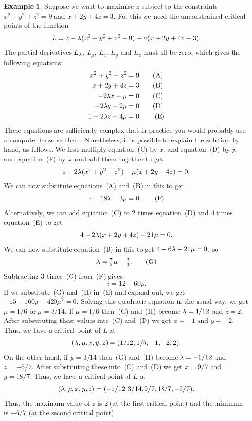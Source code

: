 \documentclass[reqno]{amsart}
\theoremstyle{definition}
\newtheorem{example}[theorem]{Example}
\begin{document}
\begin{example}\label{eg-two-constraints}
 Suppose we want to maximise $z$ subject to the constraints
 $x^2+y^2+z^2=9$ and $x+2y+4z=3$.  For this we need the unconstrained
 critical points of the function 
 \[ L = z - \lambda(x^2+y^2+z^2-9) - \mu(x+2y+4z-3). \]
 The partial derivatives $L_\lambda$, $L_\mu$, $L_x$, $L_y$ and $L_z$ must
 all be zero, which gives the following equations:
 \begin{align*}
  x^2+y^2+z^2      &= 9  \tag{A} \\
  x+2y+4z          &= 3  \tag{B} \\
    -2\lambda x -  \mu &= 0  \tag{C} \\
    -2\lambda y - 2\mu &= 0  \tag{D} \\
  1 -2\lambda z - 4\mu &= 0. \tag{E}
 \end{align*}
 These equations are sufficiently complex that in practice you would
 probably use a computer to solve them.  Nonetheless, it is possible
 to explain the solution by hand, as follows.  We first multiply
 equation~(C) by $x$, and equation~(D) by $y$, and equation~(E) by
 $z$, and add them together to get
 \[ z -2\lambda(x^2+y^2+z^2) - \mu(x+2y+4z) = 0. \]
 We can now substitute equations~(A) and~(B) in this to get
 \[ z - 18\lambda - 3\mu = 0. \tag{F} \]
 Alternatively, we can add equation~(C) to $2$ times equation~(D) and
 $4$ times equation~(E) to get
 \[ 4 - 2\lambda(x+2y+4z) - 21\mu = 0. \]
 We can now substitute equation~(B) in this to get $4-6\lambda-21\mu=0$,
 so 
 \[ \lambda = \tfrac{7}{2}\mu - \tfrac{2}{3}. \tag{G} \]
 Subtracting $3$ times~(G) from~(F) gives 
 \[ z = 12-60\mu. \tag{H} \]
 If we substitute~(G) and~(H) in~(E) and expand out, we get
 $-15+160\mu-420\mu^2=0$.  Solving this quadratic equation in the
 usual way, we get $\mu=1/6$ or $\mu=3/14$.  If $\mu=1/6$ then~(G)
 and~(H) become $\lambda=1/12$ and $z=2$.  After substituting these values
 into~(C) and~(D) we get $x=-1$ and $y=-2$.  Thus, we have a critical
 point of $L$ at 
 \[ (\lambda,\mu,x,y,z) = (1/12,1/6,-1,-2,2). \]
 On the other hand, if $\mu=3/14$ then~(G) and~(H) become $\lambda=-1/12$
 and $z=-6/7$.  After substituting these into~(C) and~(D) we get
 $x=9/7$ and $y=18/7$.  Thus, we have a critical
 point of $L$ at 
 \[ (\lambda,\mu,x,y,z) = (-1/12,3/14,9/7,18/7,-6/7). \]
 Thus, the maximum value of $z$ is $2$ (at the first critical point)
 and the minimum is $-6/7$ (at the second critical point).


\end{example}
\end{document}
